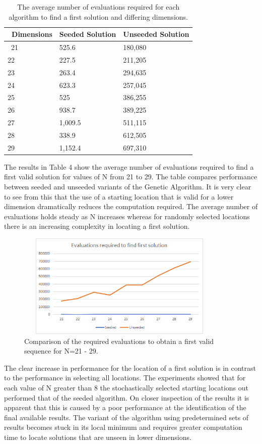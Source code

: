 \documentclass[conference]{IEEEtran}
\begin{document}
\begin{table}[ht]
	\begin{tabular}{|p{2cm}|p{6cm}|p{6cm}|} 
		\hline\
		Dimensions & Seeded Solution & Unseeded Solution \\
		\hline\
		21 & 525.6 & 180,080 \\
		22 & 227.5 & 211,205 \\
		23 & 263.4 & 294,635 \\
		24 & 623.3 & 257,045 \\
		25 & 525 & 386,255 \\
		26 & 938.7 & 389,225 \\
		27 & 1,009.5 & 511,115 \\
		28 & 338.9 & 612,505 \\
		29 & 1,152.4 & 697,310 \\		
		\hline
	\end{tabular}
	\caption{The average number of evaluations required for each algorithm to find a first solution and differing dimensions.}
\end{table}

The results in Table 4 show the average number of evaluations required to find a first valid solution for values of N from 21 to 29. The table compares performance between seeded and unseeded variants of the Genetic Algorithm. It is very clear to see from this that the use of a starting location that is valid for a lower dimension dramatically reduces the computation required. The average number of evaluations holds steady as N increases whereas for randomly selected locations there is an increasing complexity in locating a first solution.

\begin{figure}[!htbp]
	\centering	
	\includegraphics[width=10cm, height=5cm]{EvaluationsFirstSolution}
	\caption{Comparison of the required evaluations to obtain a first valid sequence for N=21 - 29.}
\end{figure}

The clear increase in performance for the location of a first solution is in contrast to the performance in selecting all locations. The experiments showed that for each value of N greater than 8 the stochastically selected starting locations out performed that of the seeded algorithm. On closer inspection of the results it is apparent that this is caused by a poor performance at the identification of the final available results. The variant of the algorithm using predetermined sets of results becomes stuck in its local minimum and requires greater computation time to locate solutions that are unseen in lower dimensions.
\end{document}
